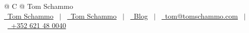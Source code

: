 \documentclass[a4paper,11pt]{article}
\begin{document}
\pagestyle{empty}


\begin{tabularx}{\linewidth}{@{} C @{}}
\Huge{Tom Schammo} \\[7.5pt]
\href{https://github.com/TomSchammo}{\raisebox{-0.05\height}\faGithub\ Tom Schammo} \ $|$ \
\href{https://www.linkedin.com/in/tom-schammo-a1496a308/}{\raisebox{-0.05\height}\faLinkedin\ Tom Schammo} \ $|$ \
\href{https://blog.tomschammo.com}{\raisebox{-0.05\height}\faGlobe \ Blog} \ $|$ \
\href{mailto:tom@tomschammo.com}{\raisebox{-0.05\height}\faEnvelope \ tom@tomschammo.com} \ $|$ \
\href{tel:+352 621 48 0040}{\raisebox{-0.05\height}\faMobile \ +352 621 48 0040} \\
\end{tabularx}

\end{document}

